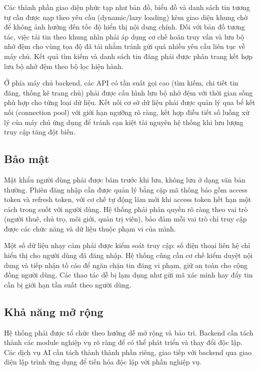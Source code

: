 Các thành phần giao diện phức tạp như bản đồ, biểu đồ và danh sách tin tương tự cần được nạp theo yêu cầu (dynamic/lazy loading) kèm giao diện khung chờ để không ảnh hưởng đến tốc độ hiển thị nội dung chính. Đối với bản đồ tương tác, việc tải tin theo khung nhìn phải áp dụng cơ chế hoãn truy vấn và lưu bộ nhớ đệm cho vùng tọa độ đã tải nhằm tránh gửi quá nhiều yêu cầu liên tục về máy chủ. Kết quả tìm kiếm và danh sách tin đăng phải được phân trang kết hợp lưu bộ nhớ đệm theo bộ lọc hiện hành.

Ở phía máy chủ backend, các API có tần suất gọi cao (tìm kiếm, chi tiết tin đăng, thống kê trang chủ) phải được cấu hình lưu bộ nhớ đệm với thời gian sống phù hợp cho từng loại dữ liệu. Kết nối cơ sở dữ liệu phải được quản lý qua bể kết nối (connection pool) với giới hạn ngưỡng rõ ràng, kết hợp điều tiết số luồng xử lý của máy chủ ứng dụng để tránh cạn kiệt tài nguyên hệ thống khi lưu lượng truy cập tăng đột biến.

\FloatBarrier
\subsection{Bảo mật}

Mật khẩu người dùng phải được băm trước khi lưu, không lưu ở dạng văn bản thường. Phiên đăng nhập cần được quản lý bằng cặp mã thông báo gồm access token và refresh token, với cơ chế tự động làm mới khi access token hết hạn một cách trong suốt với người dùng. Hệ thống phải phân quyền rõ ràng theo vai trò (người thuê, chủ trọ, môi giới, quản trị viên), bảo đảm mỗi vai trò chỉ truy cập được các chức năng và dữ liệu thuộc phạm vi của mình.

Một số dữ liệu nhạy cảm phải được kiểm soát truy cập: số điện thoại liên hệ chỉ hiển thị cho người dùng đã đăng nhập. Hệ thống cũng cần cơ chế kiểm duyệt nội dung và tiếp nhận tố cáo để ngăn chặn tin đăng vi phạm, giữ an toàn cho cộng đồng người dùng. Các thao tác dễ bị lạm dụng như gửi mã xác minh hay đẩy tin cần bị giới hạn tần suất theo người dùng.

\FloatBarrier
\subsection{Khả năng mở rộng}

Hệ thống phải được tổ chức theo hướng dễ mở rộng và bảo trì. Backend cần tách thành các module nghiệp vụ rõ ràng để có thể phát triển và thay đổi độc lập. Các dịch vụ AI cần tách thành thành phần riêng, giao tiếp với backend qua giao diện lập trình ứng dụng để tiến hóa độc lập với phần nghiệp vụ.

